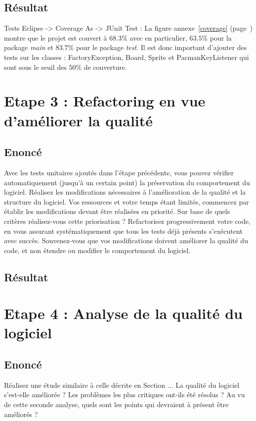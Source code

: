 \documentclass[12pt,a4paper,final]{article}
\newcommand{\annexe}[1]{annexe~\ref{#1} (page~\pageref{#1})}
\begin{document}
\subsection{Résultat}

Tests  Eclipse -> Coverage As -> JUnit Test : La figure \annexe{coverage} montre que le projet est couvert à $68.3 \%$ avec en particulier, $63.5\%$ pour la package \emph{main} et $83.7\%$ pour le package \emph{test}.
 Il est donc important d'ajouter des tests sur les classes : FactoryException, Board, Sprite et PacmanKeyListener qui sont sous le seuil des $50 \%$ de couverture.

\newpage
\section{Etape 3 : Refactoring en vue d'améliorer la qualité}\label{sec:etape3}
\subsection{Enoncé}
Avec les tests unitaires ajoutés dans l'étape précédente, vous pouvez vérifier automatiquement (jusqu'à un certain point) la préservation du comportement du logiciel. Réalisez les modifications nécessaires à l'amélioration de la qualité et la structure du logiciel. 
Vos ressources et votre temps étant limités, commencez par établir les modifications devant être réalisées en priorité. Sur base de quels critères réalisez-vous cette priorisation ?
Refactorisez progressivement votre code, en vous assurant systématiquement que tous les tests déjà présents s'exécutent avec succès. Souvenez-vous que vos modifications doivent améliorer la qualité du code, et non étendre ou modifier le comportement du logiciel.

\subsection{Résultat}



\newpage
\section{Etape 4 : Analyse de la qualité du logiciel}\label{sec:etape4}
\subsection{Enoncé}
Réalisez une étude similaire à celle décrite en Section ... La qualité du logiciel s'est-elle améliorée ? Les problèmes les plus critiques ont-ils été résolus ? Au vu de cette seconde analyse, quels sont les points qui devraient à présent être améliorés ?
\end{document}
